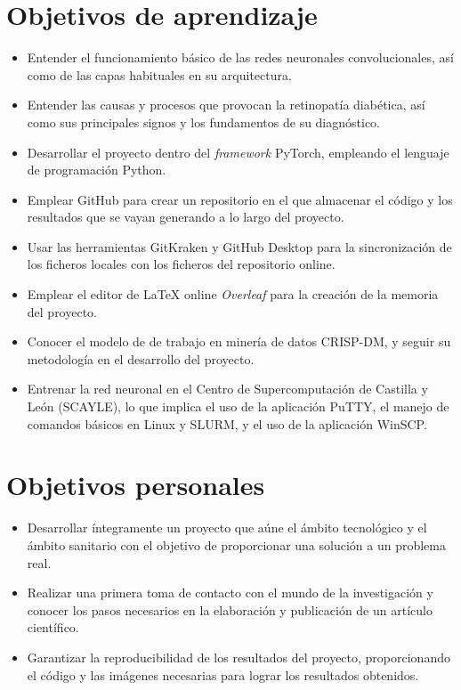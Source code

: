 \section{Objetivos de aprendizaje}
\begin{itemize}[itemsep=0.25em]
    \item Entender el funcionamiento básico de las redes neuronales convolucionales, así como de las capas habituales en su arquitectura.
    \item Entender las causas y procesos que provocan la retinopatía diabética, así como sus principales signos y los fundamentos de su diagnóstico.
    \item Desarrollar el proyecto dentro del \textit{framework} PyTorch, empleando el lenguaje de programación Python.
    \item Emplear GitHub para crear un repositorio en el que almacenar el código y los resultados que se vayan generando a lo largo del proyecto.
    \item Usar las herramientas GitKraken y GitHub Desktop para la sincronización de los ficheros locales con los ficheros del repositorio online. 
    \item Emplear el editor de LaTeX online \textit{Overleaf} para la creación de la memoria del proyecto.
    \item Conocer el modelo de de trabajo en minería de datos CRISP-DM, y seguir su metodología en el desarrollo del proyecto.
    \item Entrenar la red neuronal en el Centro de Supercomputación de Castilla y León (SCAYLE), lo que implica el uso de la aplicación PuTTY, el manejo de comandos básicos en Linux y SLURM, y el uso de la aplicación WinSCP.
\end{itemize}

\section{Objetivos personales}
\begin{itemize}[itemsep=0.25em]
    \item Desarrollar íntegramente un proyecto que aúne el ámbito tecnológico y el ámbito sanitario con el objetivo de proporcionar una solución a un problema real.
    \item Realizar una primera toma de contacto con el mundo de la investigación y conocer los pasos necesarios en la elaboración y publicación de un artículo científico.
    \item Garantizar la reproducibilidad de los resultados del proyecto, proporcionando el código y las imágenes necesarias para lograr los resultados obtenidos.
\end{itemize}